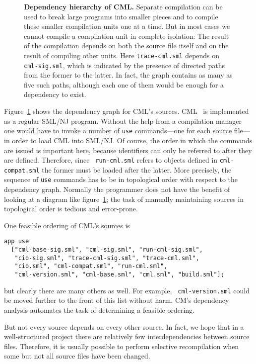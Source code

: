 \documentclass{article}
\begin{document}
\begin{figure}
\centerline{}
\caption{{\bf Dependency hierarchy of CML.}{\small\advance\baselineskip-2pt
Separate compilation can be used to break large programs into smaller
pieces and to compile these smaller compilation units one at a time.
But in most cases we cannot compile a compilation unit in complete
isolation:  The result of the compilation depends on both the source
file itself and on the result of compiling other units.
Here {\tt trace-cml.sml} depends on {\tt cml-sig.sml}, which is
indicated by the presence of directed paths from the former to
the latter.  In fact, the graph contains as many as five such paths,
although each one of them would be enough for a dependency to exist.
}}
\label{fig:cml-hier}
\end{figure}

Figure~\ref{fig:cml-hier} shows the dependency graph for CML's
sources.  CML~\cite{reppy91:cml} is implemented as a regular SML/NJ
program.  Without the help from a compilation manager one would have
to invoke a number of {\tt use} commands---one for each source
file---in order to load CML into SML/NJ.  Of course, the order in
which the commands are issued is important here, because identifiers
can only be referred to after they are defined.  Therefore, since {\tt
run-cml.sml} refers to objects defined in {\tt cml-compat.sml} the
former must be loaded after the latter.  More precisely, the sequence
of {\tt use} commands has to be in topological order with respect to
the dependency graph.  Normally the programmer does not have the
benefit of looking at a diagram like figure~\ref{fig:cml-hier}; the
task of manually maintaining sources in topological order is tedious
and error-prone.

One feasible ordering of CML's sources is
\begin{verbatim}
app use
  ["cml-base-sig.sml", "cml-sig.sml", "run-cml-sig.sml",
   "cio-sig.sml", "trace-cml-sig.sml", "trace-cml.sml",
   "cio.sml", "cml-compat.sml", "run-cml.sml",
   "cml-version.sml", "cml-base.sml", "cml.sml", "build.sml"];
\end{verbatim}
but clearly there are many others as well.  For example, {\tt
cml-version.sml} could be moved further to the front of this list
without harm.  CM's dependency analysis automates the task of
determining a feasible ordering.

But not every source depends on every other source. In fact, we hope
that in a well-structured project there are relatively few
interdependencies between source files.  Therefore, it is usually
possible to perform selective recompilation when some but not all
source files have been changed.
\end{document}
